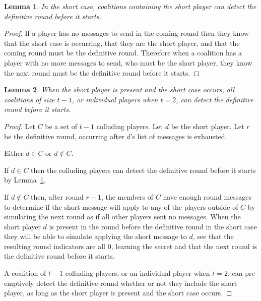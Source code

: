 \documentclass[12pt]{dalcsthesis}
\newtheorem{lemma}{Lemma}
\begin{document}
\begin{lemma}\label{Lem:SUIP:ShortPlayerCoalitionsPremptivelyKnowShortRound}In the short case, coalitions containing the short player can detect the definitive round before it starts.\end{lemma}
\begin{proof}
If a player has no messages to send in the coming round then they know that the short case is occurring, that they are the short player, and that the coming round must be the definitive round. Therefore when a coalition has a player with no more messages to send, who must be the short player, they know the next round must be the definitive round before it starts.
\end{proof}

\begin{lemma}\label{Lem:SUIP:MaxSizeCoalitionsPremptivelyKnowShortRound}When the short player is present and the short case occurs, all coalitions of size $t-1$, or individual players when $t = 2$, can detect the definitive round before it starts.\end{lemma}
\begin{proof}
Let $C$ be a set of $t-1$ colluding players. Let $d$ be the short player. Let $r$ be the definitive round, occurring after $d$'s list of messages is exhausted.

Either $d \in C$ or $d \notin C$.

If $d \in C$ then the colluding players can detect the definitive round before it starts by Lemma~\ref{Lem:SUIP:ShortPlayerCoalitionsPremptivelyKnowShortRound}.

If $d \notin C$ then, after round $r-1$, the members of $C$ have enough round messages to determine if the short message will apply to any of the players outside of $C$ by simulating the next round as if all other players sent no messages. When the short player $d$ is present in the round before the definitive round in the short case they will be able to simulate applying the short message to $d$, see that the resulting round indicators are all $0$, learning the secret and that the next round is the definitive round before it starts.

A coalition of $t-1$ colluding players, or an individual player when $t=2$, can pre-emptively detect the definitive round whether or not they include the short player, as long as the short player is present and the short case occurs.
\end{proof}
 
\end{document}
